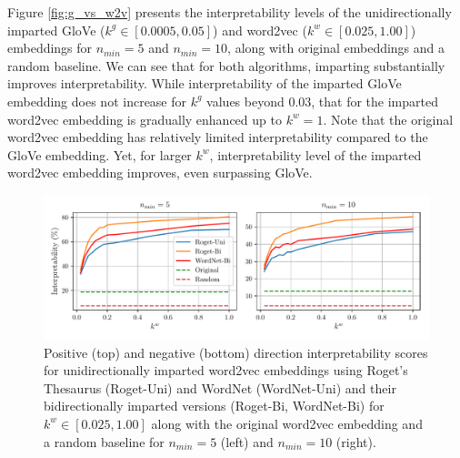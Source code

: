 \documentclass[11pt,a4paper]{article}
\begin{document}
Figure \ref{fig:g_vs_w2v} presents the interpretability levels of the unidirectionally imparted GloVe ($k^g \in [0.0005,0.05]$) and word2vec ($k^w \in [0.025,1.00]$) embeddings for $n_{min} = 5$ and $n_{min} = 10$, along with original embeddings and a random baseline. We can see that for both algorithms, imparting substantially improves interpretability. While interpretability of the imparted GloVe embedding does not increase for $k^g$ values beyond 0.03, that for the imparted word2vec embedding is gradually enhanced up to $k^w=1$. Note that the original word2vec embedding has relatively limited interpretability compared to the GloVe embedding.
Yet, for larger $k^w$, interpretability level of the imparted word2vec embedding improves, even surpassing GloVe. 

\begin{figure}
	\centering
	\includegraphics[width=16cm]{Figures/interpretability_wordnet_vs_roget.pdf}
	\caption{Positive (top) and negative (bottom) direction interpretability scores for unidirectionally imparted word2vec embeddings using Roget's Thesaurus (Roget-Uni) and WordNet (WordNet-Uni) and their bidirectionally imparted versions (Roget-Bi, WordNet-Bi) for $k^w \in [0.025,1.00]$ along with the original word2vec embedding and a random baseline for $n_{min} = 5$ (left) and $n_{min} = 10$ (right).}
	\label{fig:wordnet_vs_roget}
\end{figure}
\end{document}
